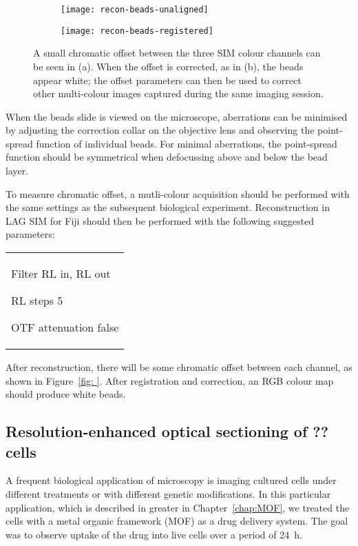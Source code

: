 \begin{figure}[p]
\centering
\begin{subfigure}[b]{0.49\textwidth}
	\texttt{[image: recon-beads-unaligned]}
	\caption{}\label{fig:recon-beads-unaligned}
\end{subfigure}
\hfill
\begin{subfigure}[b]{0.49\textwidth}
	\texttt{[image: recon-beads-registered]}
	\caption{}\label{fig:recon-beads-registered}
\end{subfigure}
\caption[LAG SIM: Multicolour alignment beads are used for correcting chromatic offset]{A small chromatic offset between the three SIM colour channels can be seen in (a). When the offset is corrected, as in (b), the beads appear white; the offset parameters can then be used to correct other multi-colour images captured during the same imaging session.  } 
\label{fig:recon-beads}
\end{figure}

When the beads slide is viewed on the microscope, aberrations can be minimised by adjusting the correction collar on the objective lens and observing the point-spread function of individual beads. 
For minimal aberrations, the point-spread function should be symmetrical when defocussing above and below the bead layer. 

To measure chromatic offset, a mutli-colour acquisition should be performed with the same settings as the subsequent biological experiment. 
Reconstruction in LAG SIM for Fiji should then be performed with the following suggested parameters: \newline
\begin{tabular}{p{}}
\begin{labelling}[margin=OTF attenuation]
	\item[Filter] RL in, RL out
	\item[RL steps] 5
	\item[OTF attenuation] false
\end{labelling}
\end{tabular}

After reconstruction, there will be some chromatic offset between each channel, as shown in Figure~\ref{fig: }. 
After registration and correction, an RGB colour map should produce white beads. 



\subsection{Resolution-enhanced optical sectioning of ?? cells}
A frequent biological application of microscopy is imaging cultured cells under different treatments or with different genetic modifications. 
In this particular application, which is described in greater in Chapter~\ref{chap:MOF}, we treated the cells with a metal organic framework (MOF) as a drug delivery system. 
The goal was to observe uptake of the drug into live cells over a period of \SI{24}{\hour}. 

